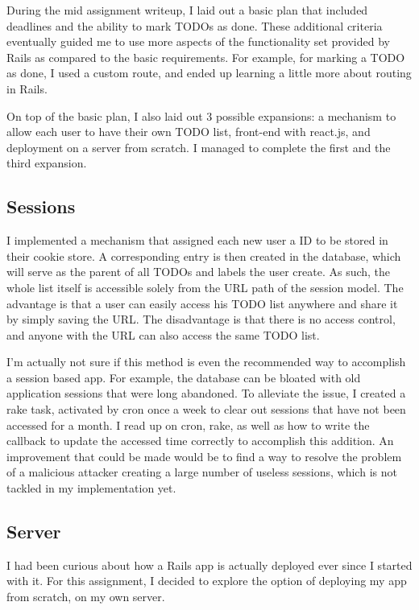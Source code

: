\documentclass[12pt, notitlepage]{article}
\begin{document}
During the mid assignment writeup, I laid out a basic plan that included deadlines and the ability to mark TODOs as done. These additional criteria eventually guided me to use more aspects of the functionality set provided by Rails as compared to the basic requirements. For example, for marking a TODO as done, I used a custom route, and ended up learning a little more about routing in Rails.

On top of the basic plan, I also laid out 3 possible expansions: a mechanism to allow each user to have their own TODO list, front-end with react.js, and deployment on a server from scratch. I managed to complete the first and the third expansion.

\subsection*{Sessions}

I implemented a mechanism that assigned each new user a ID to be stored in their cookie store. A corresponding entry is then created in the database, which will serve as the parent of all TODOs and labels the user create. As such, the whole list itself is accessible solely from the URL path of the session model. The advantage is that a user can easily access his TODO list anywhere and share it by simply saving the URL\@. The disadvantage is that there is no access control, and anyone with the
URL can also access the same TODO list.

I'm actually not sure if this method is even the recommended way to accomplish a session based app. For example, the database can be bloated with old application sessions that were long abandoned. To alleviate the issue, I created a rake task, activated by cron once a week to clear out sessions that have not been accessed for a month. I read up on cron, rake, as well as how to write the callback to update the accessed time correctly to accomplish this addition. An improvement that could be
made would be to find a way to resolve the problem of a malicious attacker creating a large number of useless sessions, which is not tackled in my implementation yet.

\subsection*{Server}

I had been curious about how a Rails app is actually deployed ever since I started with it. For this assignment, I decided to explore the option of deploying my app from scratch, on my own server.
\end{document}
